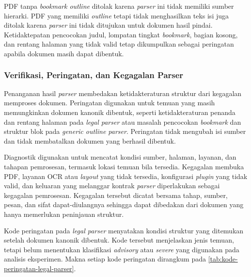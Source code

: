 PDF tanpa \textit{bookmark outline} ditolak karena \textit{parser} ini tidak memiliki sumber hierarki.
PDF yang memiliki \textit{outline} tetapi tidak menghasilkan teks isi juga ditolak karena \textit{parser} ini tidak ditujukan untuk dokumen hasil pindai.
Ketidaktepatan pencocokan judul, lompatan tingkat \textit{bookmark}, bagian kosong, dan rentang halaman yang tidak valid tetap dikumpulkan sebagai peringatan apabila dokumen masih dapat dibentuk.

\subsubsection{Verifikasi, Peringatan, dan Kegagalan Parser}
\label{sec:solusi-verifikasi-ekstraksi}

Penanganan hasil \textit{parser} membedakan ketidakteraturan struktur dari kegagalan memproses dokumen.
Peringatan digunakan untuk temuan yang masih memungkinkan dokumen kanonik dibentuk, seperti ketidakteraturan penanda dan rentang halaman pada \textit{legal parser} atau masalah pencocokan \textit{bookmark} dan struktur blok pada \textit{generic outline parser}.
Peringatan tidak mengubah isi sumber dan tidak membatalkan dokumen yang berhasil dibentuk.

Diagnostik digunakan untuk mencatat kondisi sumber, halaman, layanan, dan tahapan pemrosesan, termasuk lokasi temuan bila tersedia.
Kegagalan membuka PDF, layanan OCR atau \textit{layout} yang tidak tersedia, konfigurasi \textit{plugin} yang tidak valid, dan keluaran yang melanggar kontrak \textit{parser} diperlakukan sebagai kegagalan pemrosesan.
Kegagalan tersebut dicatat bersama tahap, sumber, pesan, dan sifat dapat-diulangnya sehingga dapat dibedakan dari dokumen yang hanya memerlukan peninjauan struktur.

Kode peringatan pada \textit{legal parser} menyatakan kondisi struktur yang ditemukan setelah dokumen kanonik dibentuk.
Kode tersebut menjelaskan jenis temuan, tetapi belum menentukan klasifikasi \textit{advisory} atau \textit{severe} yang digunakan pada analisis eksperimen.
Makna setiap kode peringatan dirangkum pada \autoref{tab:kode-peringatan-legal-parser}.

